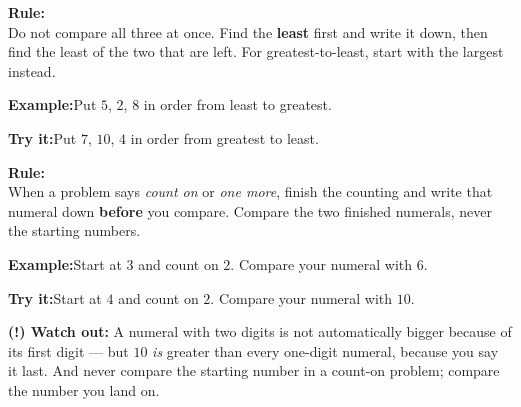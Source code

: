 \documentclass[12pt]{article}
\begin{document}
\begin{formulabox}\textbf{Rule:}\\[3pt]
Do not compare all three at once. Find the \textbf{least} first and write it
down, then find the least of the two that are left. For greatest-to-least,
start with the largest instead.
\end{formulabox}
\begin{examplebox}\textbf{Example:}\quad Put $5$, $2$, $8$ in order from least
to greatest.
\end{examplebox}
\begin{tryitbox}\textbf{Try it:}\quad Put $7$, $10$, $4$ in order from
greatest to least.\\[2pt]
\end{tryitbox}

\begin{formulabox}\textbf{Rule:}\\[3pt]
When a problem says \emph{count on} or \emph{one more}, finish the counting
and write that numeral down \textbf{before} you compare. Compare the two
finished numerals, never the starting numbers.
\end{formulabox}
\begin{examplebox}\textbf{Example:}\quad Start at $3$ and count on $2$. Compare
your numeral with $6$.
\end{examplebox}
\begin{tryitbox}\textbf{Try it:}\quad Start at $4$ and count on $2$. Compare
your numeral with $10$.\\[2pt]
\end{tryitbox}

\begin{watchoutbox}\textbf{(!) Watch out:} A numeral with two digits is not
automatically bigger because of its first digit --- but $10$ \emph{is} greater
than every one-digit numeral, because you say it last. And never compare the
starting number in a count-on problem; compare the number you land on.
\end{watchoutbox}
\end{document}
